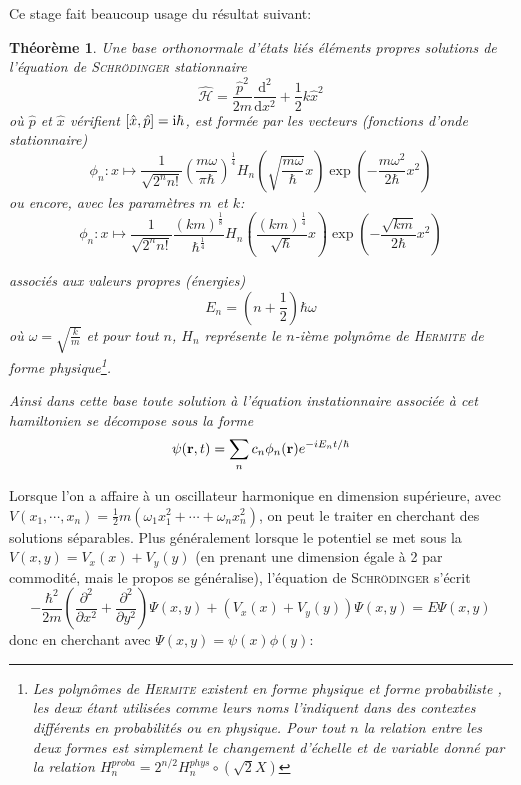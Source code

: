 \documentclass[svgnames,dvipsnames,a4paper,10pt,french]{report}
\newtheorem{theorem}{Théorème}[section]
\begin{document}
Ce stage fait beaucoup usage du résultat suivant:

\begin{theorem}
\label{bo_osc_harm}
Une base orthonormale d'états liés éléments propres solutions de l'équation de \textsc{Schrödinger} stationnaire 
\begin{equation}
    \hat{\mathcal{H}} = \frac{\hat{p}^2}{2m} \frac{\mathrm{d}^2}{\mathrm{d} x^2} + \frac{1}{2}k \hat{x}^2
\end{equation}
où $\hat{p}$ et $\hat{x}$ vérifient $[\hat{x},\hat{p}] = \mathrm{i} \hbar$, est formée par les vecteurs (fonctions d'onde stationnaire)
\begin{equation}
\label{formule_osc_gauss}
    \phi_n:x\mapsto \frac{1}{\sqrt{2^n n!}} \left(\frac{m\omega}{\pi\hbar} \right)^{\frac{1}{4}} H_n\left(\sqrt{\frac{m\omega}{\hbar}}x\right) \exp \left( -\frac{m\omega^2}{2\hbar}x^2\right)
\end{equation}
ou encore, avec les paramètres $m$ et $k$:
\begin{equation}
\label{formule_osc_gauss_bis}
    \phi_n:x\mapsto \frac{1}{\sqrt{2^n n!}} \frac{(km)^{\frac{1}{8}}}{\hbar^{\frac{1}{4}}} H_n\left(\frac{(km)^{\frac{1}{4}}}{\sqrt{\hbar}}x\right) \exp \left( -\frac{\sqrt{km}}{2\hbar}x^2\right)
\end{equation}

associés aux valeurs propres (énergies) 
\begin{equation}
    E_n = \left(n+\frac{1}{2}\right) \hbar \omega
\end{equation} 
où $\omega = \sqrt{\frac{k}{m}}$ et pour tout $n$, $H_n$ représente le $n$-ième polynôme de \textsc{Hermite} de forme physique\footnote{Les polynômes de \textsc{Hermite} existent en forme \og physique \fg{} et forme \og probabiliste \fg{}, les deux étant utilisées comme leurs noms l'indiquent dans des contextes différents en probabilités ou en physique. Pour tout $n$ la relation entre les deux formes est simplement le changement d'échelle et de variable donné par la relation $H_n^{proba} = 2^{n/2} H_n^{phys} \circ (\sqrt{2}X)$}. 

Ainsi dans cette base toute solution à l'équation instationnaire associée à cet hamiltonien se décompose sous la forme
\begin{equation}
    \psi(\mathbf{r},t) = \sum_n c_n \phi_n (\mathbf{r}) e^{-iE_nt/\hbar}
\end{equation}
\end{theorem}


Lorsque l'on a affaire à un oscillateur harmonique en dimension supérieure, avec $V(x_1,\cdots,x_n) = \frac{1}{2}m(\omega_1 x_1^2 + \cdots + \omega_nx_n^2)$, on peut le traiter en cherchant des solutions séparables. Plus généralement lorsque le potentiel se met sous la $V(x,y) = V_x(x) + V_y(y)$ (en prenant une dimension égale à 2 par commodité, mais le propos se généralise), l'équation de \textsc{Schrödinger} s'écrit
\begin{equation}
    -\frac{\hbar^2}{2m}\left( \frac{\partial^2}{\partial x^2} + \frac{\partial^2}{\partial y^2}
\right)\Psi(x,y) + (V_x(x)+ V_y(y))\Psi(x,y) = E\Psi(x,y)
\end{equation}
donc en cherchant avec $\Psi(x,y) = \psi(x)\phi(y)$:
\end{document}
